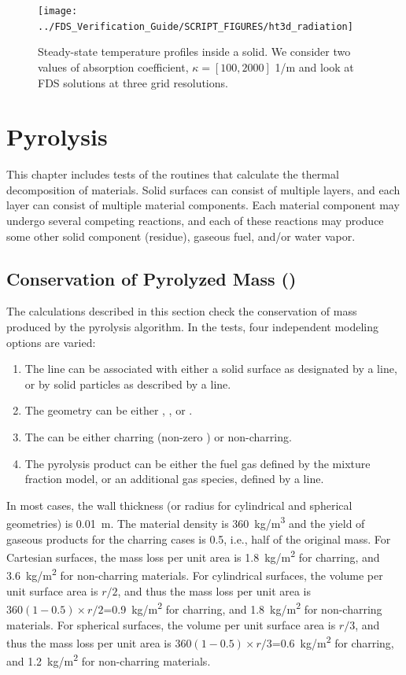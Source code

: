 \documentclass[11pt]{book}
\begin{document}
\begin{figure}[ht]
\centering
\texttt{[image: ../FDS\_Verification\_Guide/SCRIPT\_FIGURES/ht3d\_radiation]}
\caption[The  solution]{Steady-state temperature profiles inside a solid.  We consider two values of absorption coefficient, $\kappa = [100, 2000]$ 1/m and look at FDS solutions at three grid resolutions.}
\label{fig:ht3d_radiation}
\end{figure}



\chapter{Pyrolysis}

This chapter includes tests of the routines that calculate the thermal decomposition of materials. Solid surfaces can consist of multiple layers, and each layer can consist of multiple material components. Each material component may undergo several competing reactions, and each of these reactions may produce some other solid component (residue), gaseous fuel, and/or water vapor.

\section{Conservation of Pyrolyzed Mass (\texorpdfstring{}{surf\_mass\_conservation})}

The calculations described in this section check the conservation of mass produced by the pyrolysis algorithm. In the tests, four independent modeling options are varied:
\begin{enumerate}
\item The  line can be associated with either a solid surface as designated by a  line, or by solid particles as described by a  line.
\item The  geometry can be either , , or .
\item The  can be either charring (non-zero ) or non-charring.
\item The pyrolysis product can be either the fuel gas defined by the mixture fraction model, or an additional gas species, defined by a  line.
\end{enumerate}
In most cases, the wall thickness (or radius for cylindrical and spherical geometries) is 0.01~m. The material density is 360~\si{kg/m^3} and the yield of gaseous products for the charring cases is 0.5, i.e., half of the original mass. For Cartesian surfaces, the mass loss per unit area is 1.8~\si{kg/m^2} for charring, and 3.6~\si{kg/m^2} for non-charring materials. For cylindrical surfaces, the volume per unit surface area is $r/2$, and thus the mass loss per unit area is $360(1-0.5) \times r/2$=0.9~\si{kg/m^2} for charring, and 1.8~\si{kg/m^2} for non-charring materials. For spherical surfaces, the volume per unit surface area is $r/3$, and thus the mass loss per unit area is $360(1-0.5) \times r/3$=0.6~\si{kg/m^2} for charring, and 1.2~\si{kg/m^2} for non-charring materials.
\end{document}
